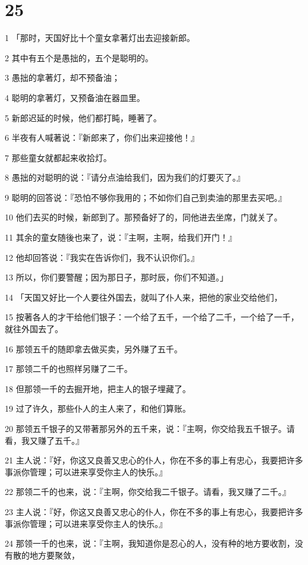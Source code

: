 \chapter{25}

\par 1 「那时，天国好比十个童女拿著灯出去迎接新郎。
\par 2 其中有五个是愚拙的，五个是聪明的。
\par 3 愚拙的拿著灯，却不预备油；
\par 4 聪明的拿著灯，又预备油在器皿里。
\par 5 新郎迟延的时候，他们都打盹，睡著了。
\par 6 半夜有人喊著说：『新郎来了，你们出来迎接他！』
\par 7 那些童女就都起来收拾灯。
\par 8 愚拙的对聪明的说：『请分点油给我们，因为我们的灯要灭了。』
\par 9 聪明的回答说：『恐怕不够你我用的；不如你们自己到卖油的那里去买吧。』
\par 10 他们去买的时候，新郎到了。那预备好了的，同他进去坐席，门就关了。
\par 11 其余的童女随後也来了，说：『主啊，主啊，给我们开门！』
\par 12 他却回答说：『我实在告诉你们，我不认识你们。』
\par 13 所以，你们要警醒；因为那日子，那时辰，你们不知道。」
\par 14 「天国又好比一个人要往外国去，就叫了仆人来，把他的家业交给他们，
\par 15 按著各人的才干给他们银子：一个给了五千，一个给了二千，一个给了一千，就往外国去了。
\par 16 那领五千的随即拿去做买卖，另外赚了五千。
\par 17 那领二千的也照样另赚了二千。
\par 18 但那领一千的去掘开地，把主人的银子埋藏了。
\par 19 过了许久，那些仆人的主人来了，和他们算账。
\par 20 那领五千银子的又带著那另外的五千来，说：『主啊，你交给我五千银子。请看，我又赚了五千。』
\par 21 主人说：『好，你这又良善又忠心的仆人，你在不多的事上有忠心，我要把许多事派你管理；可以进来享受你主人的快乐。』
\par 22 那领二千的也来，说：『主啊，你交给我二千银子。请看，我又赚了二千。』
\par 23 主人说：『好，你这又良善又忠心的仆人，你在不多的事上有忠心，我要把许多事派你管理；可以进来享受你主人的快乐。』
\par 24 那领一千的也来，说：『主啊，我知道你是忍心的人，没有种的地方要收割，没有散的地方要聚敛，
